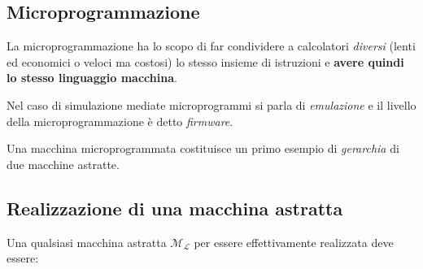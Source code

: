\documentclass[a4paper,11pt,hidelinks]{book}
\theoremstyle{definition}
\begin{document}
    \subsection{Microprogrammazione}
    \begin{multicols}{2}
    La microprogrammazione ha lo scopo di far condividere a calcolatori \textit{diversi} (lenti ed economici o veloci ma costosi) lo stesso insieme di istruzioni e \textbf{avere quindi lo stesso linguaggio macchina}.
    
    Nel caso di simulazione mediate microprogrammi si parla di \textit{emulazione} e il livello della microprogrammazione è detto \textit{firmware}.
    
    Una macchina microprogrammata costituisce un primo esempio di \textit{gerarchia} di due macchine astratte.


    \end{multicols}

    \subsection{Realizzazione di una macchina astratta}
    Una qualsiasi macchina astratta $\mathcal{M_L}$ per essere effettivamente realizzata deve essere:
    
\end{document}
